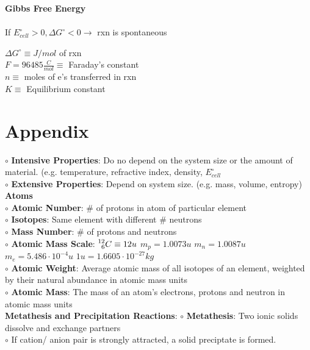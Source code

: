 \begin{minipage}{0.6\linewidth}
\textbf{Gibbs Free Energy}\\
\\
If $E_{cell}^{\circ} > 0, \Delta G^{\circ} < 0 \longrightarrow$ rxn is spontaneous
\end{minipage}
\begin{minipage}{0.39\linewidth}
    $\Delta G^{\circ} \equiv J/mol$ of rxn\\
    $F = 96485 \frac{C}{mol} \equiv$ Faraday's constant\\
    $n \equiv$ moles of e's transferred in rxn\\
    $K \equiv$ Equilibrium constant
\end{minipage}
\section{Appendix}
$\circ$ \textbf{Intensive Properties}: Do no depend on the system size or the amount of material. (e.g. temperature, refractive index, density, $E_{cell}^{\circ}$\\
$\circ$ \textbf{Extensive Properties}: Depend on system size. (e.g. mass, volume, entropy)
\vspace{3pt}\\
\textbf{Atoms}\\
$\circ$ \textbf{Atomic Number}: \# of protons in atom of particular element\\
$\circ$ \textbf{Isotopes}: Same element with different \# neutrons\\
$\circ$ \textbf{Mass Number}: \# of protons and neutrons\\
$\circ$ \textbf{Atomic Mass Scale}: $\prescript{12}{6}{C} \equiv 12u$ \hspace{7pt} $m_p = 1.0073 u$ \hspace{7pt} $m_n = 1.0087 u$ \hspace{7pt} $m_e = 5.486\cdot 10^{-4} u$ \hspace{7pt} $1u = 1.6605 \cdot 10^{-27} kg$\\
$\circ$ \textbf{Atomic Weight}: Average atomic mass of all isotopes of an element, weighted by their natural abundance in atomic mass units\\
$\circ$ \textbf{Atomic Mass}: The mass of an atom's electrons, protons and neutron in atomic mass units
\vspace{3pt}\\
\textbf{Metathesis and Precipitation Reactions}:
$\circ$ \textbf{Metathesis}: Two ionic solids dissolve and exchange partners\\
$\circ$ If cation/ anion pair is strongly attracted, a solid preciptate is formed. 


